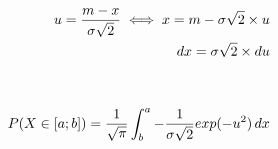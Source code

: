 \documentclass[preview]{standalone}
\begin{document}
\begin{align*}
u = {{m-x} \over {\sigma \sqrt{2}} }\iff x = m - \sigma \sqrt{2} \times u\\dx = \sigma \sqrt{2} \times du\\ \\ \\ P( X \in [a;b] ) = { \frac{1}{\sqrt{\pi}} } \int_b^a { { - \frac{1}{\sigma \sqrt{2}} } exp( -u^2 ) } \, dx
\end{align*}
\end{document}
